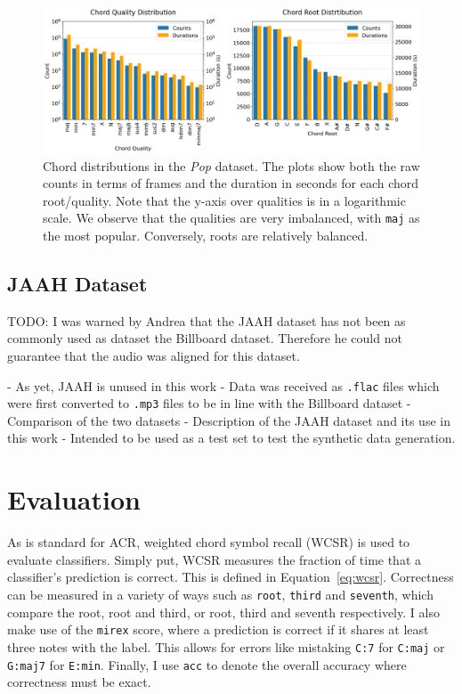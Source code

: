 \begin{figure}[H]
    \centering
    \includegraphics[width=1.0\textwidth]{figures/chord_distribution.png}
    \caption{Chord distributions in the \emph{Pop} dataset. The plots show both the raw counts in terms of frames and the duration in seconds for each chord root/quality. Note that the y-axis over qualities is in a logarithmic scale. We observe that the qualities are very imbalanced, with \texttt{maj} as the most popular. Conversely, roots are relatively balanced.}\label{fig:chord-distribution}
\end{figure}


\subsection{JAAH Dataset}

TODO: I was warned by Andrea that the JAAH dataset has not been as commonly used as dataset the Billboard dataset. Therefore he could not guarantee that the audio was aligned for this dataset.

- As yet, JAAH is unused in this work
- Data was received as \texttt{.flac} files which were first converted to \texttt{.mp3} files to be in line with the Billboard dataset
- Comparison of the two datasets
- Description of the JAAH dataset and its use in this work
- Intended to be used as a test set to test the synthetic data generation.

\section{Evaluation}\label{sec:evaluation}

As is standard for ACR, weighted chord symbol recall (WCSR) is used to evaluate classifiers. Simply put, WCSR measures the fraction of time that a classifier's prediction is correct. This is defined in Equation~\ref{eq:wcsr}. Correctness can be measured in a variety of ways such as \texttt{root}, \texttt{third} and \texttt{seventh}, which compare the root, root and third, or root, third and seventh respectively. I also make use of the \texttt{mirex} score, where a prediction is correct if it shares at least three notes with the label. This allows for errors like mistaking \texttt{C:7} for \texttt{C:maj} or \texttt{G:maj7} for \texttt{E:min}. Finally, I use \texttt{acc} to denote the overall accuracy where correctness must be exact.

